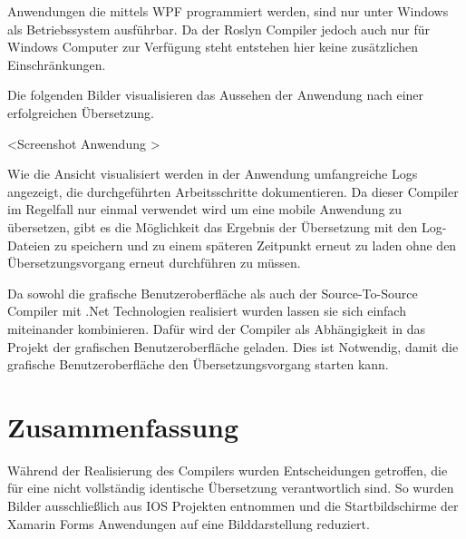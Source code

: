 Anwendungen die mittels WPF programmiert werden, sind nur unter Windows als Betriebssystem ausführbar.  Da der Roslyn Compiler jedoch auch nur für Windows Computer zur Verfügung steht entstehen hier keine zusätzlichen Einschränkungen. 

Die folgenden Bilder visualisieren das Aussehen der Anwendung nach einer erfolgreichen Übersetzung. 

<Screenshot Anwendung >

Wie die Ansicht visualisiert werden in der Anwendung umfangreiche Logs angezeigt,  die durchgeführten Arbeitsschritte dokumentieren.  Da dieser Compiler im Regelfall nur einmal verwendet wird um eine mobile Anwendung zu übersetzen,  gibt es  die Möglichkeit das Ergebnis der Übersetzung mit den Log-Dateien zu speichern und zu einem späteren Zeitpunkt erneut zu laden ohne den Übersetzungsvorgang erneut durchführen zu müssen.

Da sowohl die grafische Benutzeroberfläche als auch der Source-To-Source Compiler mit .Net Technologien realisiert wurden lassen sie sich einfach miteinander kombinieren.  Dafür wird der Compiler als Abhängigkeit in das Projekt der grafischen Benutzeroberfläche geladen.  Dies ist Notwendig,  damit die grafische Benutzeroberfläche den Übersetzungsvorgang starten kann. 

\section{Zusammenfassung}
Während der Realisierung des Compilers wurden Entscheidungen getroffen, die für eine nicht vollständig identische Übersetzung verantwortlich sind.  So wurden Bilder ausschließlich aus IOS Projekten entnommen und die Startbildschirme der Xamarin Forms Anwendungen auf eine Bilddarstellung reduziert.
